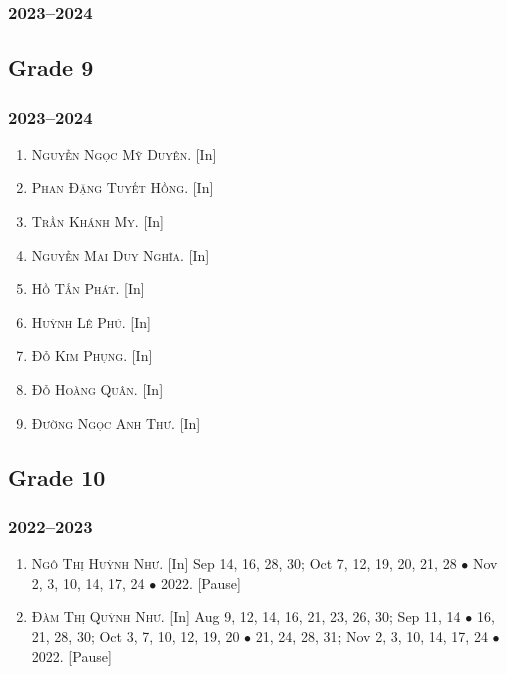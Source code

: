 \documentclass{article}
\begin{document}
\subsubsection{2023--2024}

\subsection{Grade 9}

\subsubsection{2023--2024}

\begin{enumerate}
	\item \textsc{Nguyễn Ngọc Mỹ Duyên.} \textsf{[In]} 
	\item \textsc{Phan Đặng Tuyết Hồng.} \textsf{[In]} 
	\item \textsc{Trần Khánh My.} \textsf{[In]} 
	\item \textsc{Nguyễn Mai Duy Nghĩa.} \textsf{[In]} 
	\item \textsc{Hồ Tấn Phát.} \textsf{[In]} 
	\item \textsc{Huỳnh Lê Phú.} \textsf{[In]} 
	\item \textsc{Đỗ Kim Phụng.} \textsf{[In]} 
	\item \textsc{Đỗ Hoàng Quân.} \textsf{[In]} 
	\item \textsc{Đường Ngọc Anh Thư.} \textsf{[In]} 
\end{enumerate}

\subsection{Grade 10}

\subsubsection{2022--2023}

\begin{enumerate}
	\item \textsc{Ngô Thị Huỳnh Như.} \textsf{[In]} Sep 14, 16, 28, 30; Oct 7, 12, 19, 20, 21, 28 $\bullet$ Nov 2, 3, 10, 14, 17, 24 $\bullet$ 2022. \textsf{[Pause]}
	\item \textsc{Đàm Thị Quỳnh Như.} \textsf{[In]} Aug 9, 12, 14, 16, 21, 23, 26, 30; Sep 11, 14 $\bullet$ 16, 21, 28, 30; Oct 3, 7, 10, 12, 19, 20 $\bullet$ 21, 24, 28, 31; Nov 2, 3, 10, 14, 17, 24 $\bullet$ 2022. \textsf{[Pause]}
\end{enumerate}
\end{document}
